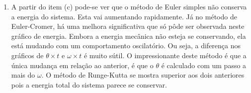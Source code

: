\documentclass[main.tex]{subfiles}
\begin{document}
\begin{enumerate}[label=\textbf{\alph*)}]
\begin{center}
    \end{center}
    \item A partir do item (c) pode-se ver que o método de Euler simples não conserva a energia do sistema. Esta vai aumentando rapidamente. Já no método de Euler-Cromer, há uma melhora significativa que só pôde ser observada
    neste gráfico de energia. Embora a energia mecânica não esteja se conservando, ela está mudando com um comportamento oscilatório. Ou seja, a diferença nos gráficos de $\theta \times t$ e $\omega \times t$ é muito sútil.
    O impressionante deste método é que a única mudança em relação ao anterior, é que o $\theta$ é calculado com um passo a mais do $\omega$. O método de Runge-Kutta se mostra superior aos dois anteriores pois a energia total do sistema parece se conservar.
\end{enumerate}
\end{document}

